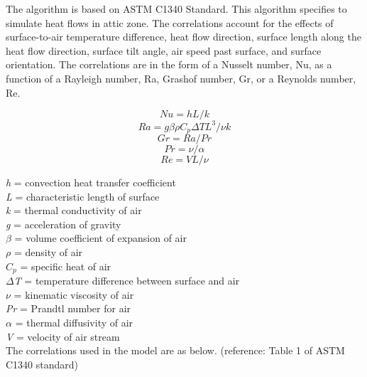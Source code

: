 The algorithm is based on ASTM C1340 Standard. This algorithm specifies to simulate heat flows in attic zone. The correlations account for the effects of surface-to-air temperature difference, heat flow direction, surface length along the heat flow direction, surface tilt angle, air speed past surface, and surface orientation. The correlations are in the form of a Nusselt number, Nu, as a function of a Rayleigh number, Ra, Grashof number, Gr, or a Reynolds number, Re.

\begin{equation}
Nu = hL/k
\end{equation}
\begin{equation}
Ra = g \beta \rho C_p \Delta TL^3 / \nu k
\end{equation}
\begin{equation}
Gr = Ra / Pr
\end{equation}
\begin{equation}
Pr = \nu / \alpha
\end{equation}
\begin{equation}
Re = VL/ \nu
\end{equation}

\noindent
\emph{h} = convection heat transfer coefficient \\
\emph{L} = characteristic length of surface \\
\emph{k} = thermal conductivity of air \\
\emph{g} = acceleration of gravity \\
$\beta$ = volume coefficient of expansion of air\\
$\rho$ = density of air\\
$C_p$ = specific heat of air\\
\emph{$\Delta$T} = temperature difference between surface and air\\
$\nu$ = kinematic viscosity of air\\
\emph{Pr} = Prandtl number for air\\
$\alpha$ = thermal diffusivity of air\\
\emph{V} = velocity of air stream\\

The correlations used in the model are as below. (reference: Table 1 of ASTM C1340 standard)

